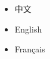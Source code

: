 \documentclass[nofonts]{ctexart}
\begin{document}
\begin{itemize}
		\item 中文
		\item English
		\item Fran\c{c}ais
\end{itemize}
\end{document}
